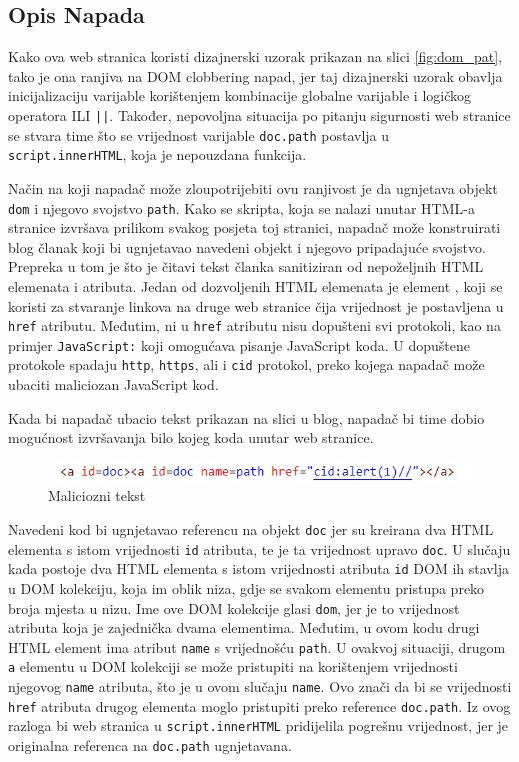 \documentclass[12pt, oneside, onecolumn]{book}
\begin{document}
{\subsection{Opis Napada}
Kako ova web stranica koristi dizajnerski uzorak prikazan na slici \ref{fig:dom_pat}, tako je ona ranjiva na DOM clobbering napad, jer taj dizajnerski uzorak obavlja inicijalizaciju varijable korištenjem kombinacije globalne varijable i logičkog operatora ILI \texttt{||}. Također, nepovoljna situacija po pitanju sigurnosti web stranice se stvara time što se vrijednost varijable \texttt{doc.path} postavlja u \texttt{script.innerHTML}, koja je nepouzdana funkcija.

Način na koji napadač može zloupotrijebiti ovu ranjivost je da ugnjetava objekt \texttt{dom} i njegovo svojstvo \texttt{path}. Kako se skripta, koja se nalazi unutar HTML-a stranice izvršava prilikom svakog posjeta toj stranici, napadač može konstruirati blog članak koji bi ugnjetavao navedeni objekt i njegovo pripadajuće svojstvo. Prepreka u tom je što je čitavi tekst članka sanitiziran od nepoželjnih HTML elemenata i atributa. Jedan od dozvoljenih HTML elemenata je element \texttt{}, koji se koristi za stvaranje linkova na druge web stranice čija vrijednost je postavljena u \texttt{href} atributu. Međutim, ni u \texttt{href} atributu nisu dopušteni svi protokoli, kao na primjer \texttt{JavaScript:} koji omogućava pisanje JavaScript koda. U dopuštene protokole spadaju \texttt{http}, \texttt{https}, ali i \texttt{cid} protokol, preko kojega napadač može ubaciti maliciozan JavaScript kod.

Kada bi napadač ubacio tekst prikazan na slici u blog, napadač bi time dobio mogućnost izvršavanja bilo kojeg koda unutar web stranice.

\begin{figure}[H]
	\begin{center}
		\includegraphics[width=\textwidth]{dom_pay.jpg}
		\caption{Maliciozni tekst} \label{fig:dom_pay}
	\end{center}
\end{figure}

Navedeni kod bi ugnjetavao referencu na objekt \texttt{doc} jer su kreirana dva HTML elementa s istom vrijednosti \texttt{id} atributa, te je ta vrijednost upravo \texttt{doc}. U slučaju kada postoje dva HTML elementa s istom vrijednosti atributa \texttt{id} DOM ih stavlja u DOM kolekciju, koja im oblik niza, gdje se svakom elementu pristupa preko broja mjesta u nizu. Ime ove DOM kolekcije glasi \texttt{dom}, jer je to vrijednost atributa koja je zajednička dvama elementima. Međutim, u ovom kodu drugi HTML element ima atribut \texttt{name} s vrijednošću \texttt{path}. U ovakvoj situaciji, drugom \texttt{a} elementu u DOM kolekciji se može pristupiti na korištenjem vrijednosti njegovog \texttt{name} atributa, što je u ovom slučaju \texttt{name}. Ovo znači da bi se vrijednosti \texttt{href} atributa drugog elementa moglo pristupiti preko reference \texttt{doc.path}. Iz ovog razloga bi web stranica u \texttt{script.innerHTML} pridijelila pogrešnu vrijednost, jer je originalna referenca na \texttt{doc.path} ugnjetavana.

}
\end{document}
